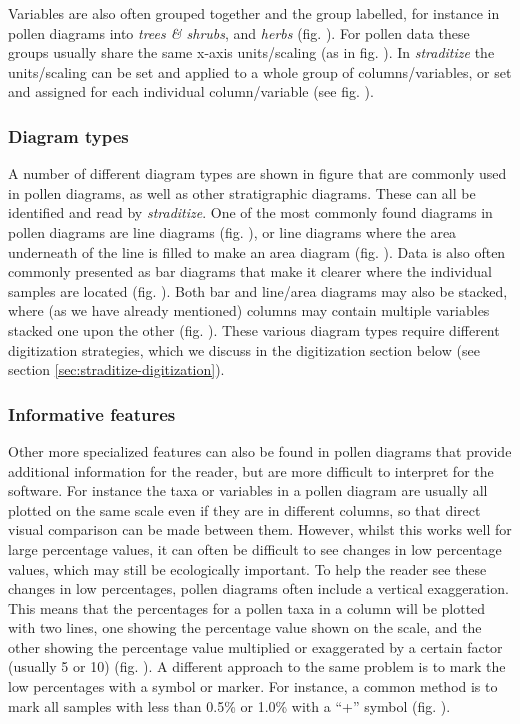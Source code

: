 \begin{refsection}
Variables are also often grouped together and the group labelled, for instance in pollen diagrams into \emph{trees \& shrubs}, and \emph{herbs} (fig. \samplediagram[d]). For pollen data these groups usually share the same x-axis units/scaling (as in fig. \samplediagram[b]). In \emph{straditize} the units/scaling can be set and applied to a whole group of columns/variables, or set and assigned for each individual column/variable (see fig. \samplediagram[e]).

\subsubsection{Diagram types}  \label{sec:straditize-types}
A number of different diagram types are shown in figure \samplediagram that are commonly used in pollen diagrams, as well as other stratigraphic diagrams. These can all be identified and read by \emph{straditize}. One of the most commonly found diagrams in pollen diagrams are line diagrams (fig. \samplediagram[f]), or line diagrams where the area underneath of the line is filled to make an area diagram (fig. \samplediagram[h]). Data is also often commonly presented as bar diagrams that make it clearer where the individual samples are located (fig. \samplediagram[g]). Both bar and line/area diagrams may also be stacked, where (as we have already mentioned) columns may contain multiple variables stacked one upon the other (fig. \samplediagram[i]). These various diagram types require different digitization strategies, which we discuss in the digitization section below (see section \ref{sec:straditize-digitization}).

\subsubsection{Informative features}  \label{sec:straditize-features}
Other more specialized features can also be found in pollen diagrams that provide additional information for the reader, but are more difficult to interpret for the software. For instance the taxa or variables in a pollen diagram are usually all plotted on the same scale even if they are in different columns, so that direct visual comparison can be made between them. However, whilst this works well for large percentage values, it can often be difficult to see changes in low percentage values, which may still be ecologically important. To help the reader see these changes in low percentages, pollen diagrams often include a vertical exaggeration. This means that the percentages for a pollen taxa in a column will be plotted with two lines, one showing the percentage value shown on the scale, and the other showing the percentage value multiplied or exaggerated by a certain factor (usually 5 or 10) (fig. \samplediagram[j]). A different approach to the same problem is to mark the low percentages with a symbol or marker. For instance, a common method is to mark all samples with less than 0.5\% or 1.0\% with a \enquote{+} symbol (fig. \samplediagram[k]).


\end{refsection}
